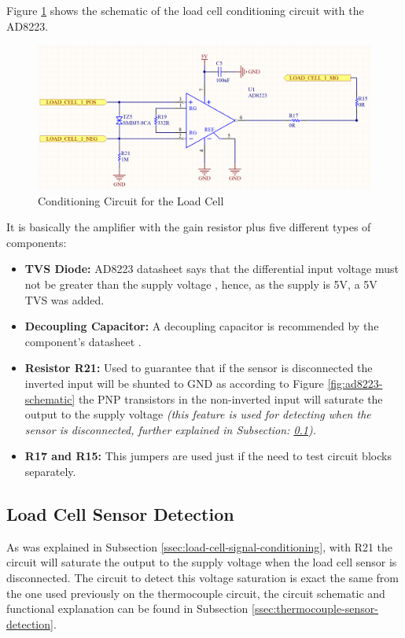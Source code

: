 		Figure \ref{fig:cic-cell} shows the schematic of the load cell conditioning circuit with the AD8223.

		\begin{figure}[htbp]
			\centering
				\includegraphics[scale=0.8]{figuras/fig-cic-cell.png}
			\caption{Conditioning Circuit for the Load Cell \cite{conditioning-circuit-for-the-load-cell}}
			\label{fig:cic-cell}
		\end{figure}

		It is basically the amplifier with the gain resistor plus five different types of components:
		\begin{itemize}
			\item \textbf{TVS Diode:} AD8223 datasheet says that the differential input voltage must not be greater than the supply voltage \cite{ad8223-datasheet}, hence, as the supply is 5V, a 5V TVS was added.
			\item \textbf{Decoupling Capacitor:} A decoupling capacitor is recommended by the component's datasheet \cite{ad8223-datasheet}.
			\item \textbf{Resistor R21:} Used to guarantee that if the sensor is disconnected the inverted input will be shunted to GND as according to Figure \ref{fig:ad8223-schematic} the PNP transistors in the non-inverted input will saturate the output to the supply voltage \textit{(this feature is used for detecting when the sensor is disconnected, further explained in Subsection: \ref{ssec:load-cell-sensor-detection}).}
			\item \textbf{R17 and R15:} This jumpers are used just if the need to test circuit blocks separately.
		\end{itemize}

\subsection{Load Cell Sensor Detection}\label{ssec:load-cell-sensor-detection}
	As was explained in Subsection \ref{ssec:load-cell-signal-conditioning}, with R21 the circuit will saturate the output to the supply voltage when the load cell sensor is disconnected. The circuit to detect this voltage saturation is exact the same from the one used previously on the thermocouple circuit, the circuit schematic and functional explanation can be found in Subsection \ref{ssec:thermocouple-sensor-detection}.

